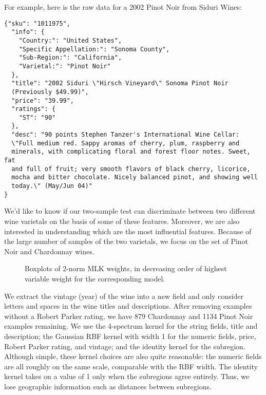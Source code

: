 For example, here is the raw data for a 2002 Pinot Noir from Siduri Wines:
\begin{verbatim}
{"sku": "1011975",
  "info": {
    "Country:": "United States",
    "Specific Appellation:": "Sonoma County",
    "Sub-Region:": "California",
    "Varietal:": "Pinot Noir"
  },
  "title": "2002 Siduri \"Hirsch Vineyard\" Sonoma Pinot Noir
  (Previously $49.99)",
  "price": "39.99",
  "ratings": {
    "ST": "90"
  },
  "desc": "90 points Stephen Tanzer's International Wine Cellar:
  \"Full medium red. Sappy aromas of cherry, plum, raspberry and
  minerals, with complicating floral and forest floor notes. Sweet, fat
  and full of fruit; very smooth flavors of black cherry, licorice,
  mocha and bitter chocolate. Nicely balanced pinot, and showing well
  today.\" (May/Jun 04)"
}
\end{verbatim}

We'd like to know if our two-sample test can discriminate between
two different wine varietals on the basis of some of these features.
Moreover, we are also interested in understanding which are the most
influential features.  Because of the large number of samples of the
two varietals, we focus on the set of Pinot Noir and Chardonnay wines.

\begin{figure}
  \begin{center}
    \resizebox{14.0cm}{!}{
      
    }
  \end{center}
\caption{Boxplots of 2-norm MLK weights, in decreasing order of
  highest variable weight for the corresponding model.}
\label{fig:wine_weights}
\end{figure}

We extract the vintage (year) of the wine into a new field and only consider
letters and spaces in the wine titles and descriptions.  After
removing examples without a Robert Parker rating, we have 879
Chardonnay and 1134 Pinot Noir examples remaining.  We use the
4-spectrum kernel for the string fields, title and description; the
Gaussian RBF kernel with width 1 for the numeric fields, price, Robert
Parker rating, and vintage; and the identity kernel for the
subregion.  Although simple, these kernel choices are also quite
reasonable: the numeric fields are all roughly on the same scale,
comparable with the RBF width.  The identity kernel takes on a value
of 1 only when the subregions agree entirely.  Thus, we lose
geographic information such as distances between subregions.

